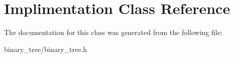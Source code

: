 \hypertarget{classImplimentation}{}\section{Implimentation Class Reference}
\label{classImplimentation}


The documentation for this class was generated from the following file\+:\begin{DoxyCompactItemize}
\item 
binary\+\_\+tree/binary\+\_\+tree.\+h\end{DoxyCompactItemize}

